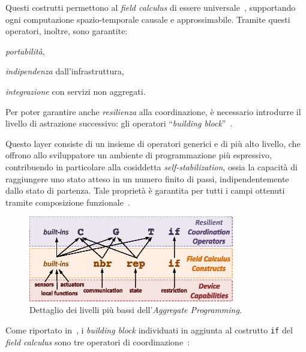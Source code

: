Questi costrutti permettono al \emph{field calculus} di essere universale~\cite{beal2014towards}, supportando ogni computazione spazio-temporale causale e approssimabile.
Tramite questi operatori, inoltre, sono garantite:
\begin{inparaitem}
  \item \emph{portabilità},
  \item \emph{indipendenza} dall'infrastruttura,
  \item \emph{integrazione} con servizi non aggregati.
\end{inparaitem}


Per poter garantire anche \emph{resilienza} alla coordinazione, è necessario introdurre il livello di astrazione successivo:
gli operatori ``\emph{building block}''~\cite{BV-FOCAS2014}.

Questo layer consiste di un insieme di operatori generici e di più alto livello, che offrono allo sviluppatore un ambiente di programmazione più espressivo,
contribuendo in particolare alla cosiddetta \emph{self-stabilization}, ossia la capacità di raggiungere uno stato atteso in un numero finito di passi,
indipendentemente dallo stato di partenza.
Tale proprietà è garantita per tutti i campi ottenuti tramite composizione funzionale~\cite{BV-FOCAS2014}.

\begin{figure}[htbp]
  \centering
  \includegraphics[width=0.8\textwidth]{res/fig/stack-detail-crop.eps}%
  \caption{Dettaglio dei livelli più bassi dell'\emph{Aggregate Programming}.}%
  \label{fig:stack-detail}
\end{figure}

Come riportato in~, i \emph{building block} individuati in aggiunta al costrutto \texttt{if} del \emph{field calculus} sono tre operatori di coordinazione~\cite{7274429,BV-FOCAS2014}:

